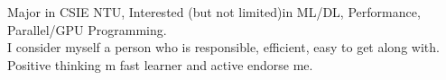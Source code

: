 

\begin{cvparagraph}

Major in CSIE  NTU,  Interested (but not limited)in  ML/DL, Performance, Parallel/GPU Programming. 
\\ I consider myself a person who is responsible, efficient, easy to get along with. Positive thinking m fast learner and active endorse me.
\end{cvparagraph}
